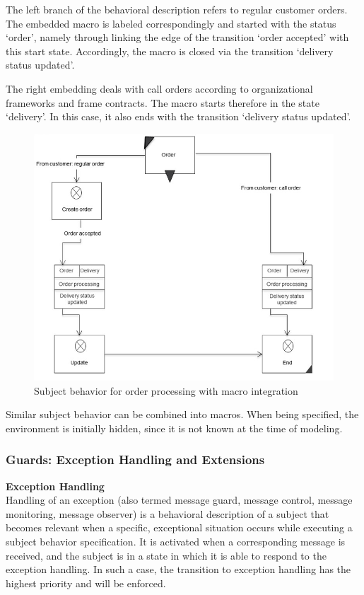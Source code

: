 The left branch of the behavioral description refers to regular customer orders. The embedded macro is labeled correspondingly and started with the status ‘order’, namely through linking the edge of the transition ‘order accepted’ with this start state. Accordingly, the macro is closed via the transition ‘delivery status updated’.

The right embedding deals with call orders according to organizational frameworks and frame contracts. The macro starts therefore in the state ‘delivery’. In this case, it also ends with the transition ‘delivery status updated’.

\begin{figure}[ph]
	\centering
	\includegraphics[width=0.6\linewidth]{20181026-Ontologie-Bilder/Grafiken-Ontologie/SUbjectExecution/MacroUsage}
	\caption[Subject behavior for order processing with macro integration]{Subject behavior for order processing with macro integration}
	\label{fig:macrousage}
\end{figure}

Similar subject behavior can be combined into macros. When being specified, the environment is initially hidden, since it is not known at the time of modeling.

\newpage

\subsubsection{Guards: Exception Handling and Extensions} 

\textbf{Exception Handling}\\
Handling of an exception (also termed message guard, message control, message monitoring, message observer) is a behavioral description of a subject that becomes relevant when a specific, exceptional situation occurs while executing a subject behavior specification. It is activated when a corresponding message is received, and the subject is in a state in which it is able to respond to the exception handling. In such a case, the transition to exception handling has the highest priority and will be enforced.

